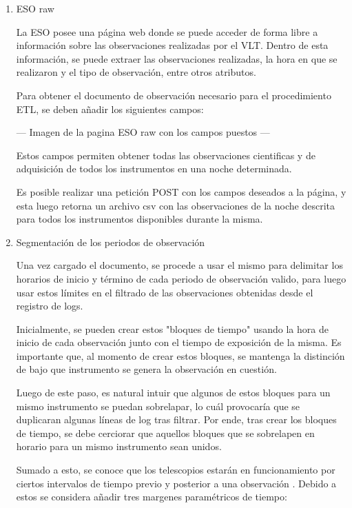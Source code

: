 \begin{enumerate}

    \item{ESO raw}
    
    La ESO posee una página web donde se puede acceder de forma libre a información sobre las observaciones realizadas por el VLT. Dentro de esta información, se puede extraer las observaciones realizadas, la hora en que se realizaron y el tipo de observación, entre otros atributos.
    
    Para obtener el documento de observación necesario para el procedimiento ETL, se deben añadir los siguientes campos:
    
    --- Imagen de la pagina ESO raw con los campos puestos ---
    
    Estos campos permiten obtener todas las observaciones cientificas y de adquisición de todos los instrumentos en una noche determinada.
    
    Es posible realizar una petición POST con los campos deseados a la página, y esta luego retorna un archivo csv con las observaciones de la noche descrita para todos los instrumentos disponibles durante la misma.

    \item{Segmentación de los periodos de observación}

    Una vez cargado el documento, se procede a usar el mismo para delimitar los horarios de inicio y término de cada periodo de observación valido, para luego usar estos límites en el filtrado de las observaciones obtenidas desde el registro de logs.

    Inicialmente, se pueden crear estos "bloques de tiempo" usando la hora de inicio de cada observación junto con el tiempo de exposición de la misma. Es importante que, al momento de crear estos bloques, se mantenga la distinción de bajo que instrumento se genera la observación en cuestión.

    Luego de este paso, es natural intuir que algunos de estos bloques para un mismo instrumento se puedan sobrelapar, lo cuál provocaría que se duplicaran algunas líneas de log tras filtrar. Por ende, tras crear los bloques de tiempo, se debe cerciorar que aquellos bloques que se sobrelapen en horario para un mismo instrumento sean unidos.

    Sumado a esto, se conoce que los telescopios estarán en funcionamiento por ciertos intervalos de tiempo previo y posterior a una observación \cite{eso1998vlt}. Debido a estos se considera añadir tres margenes paramétricos de tiempo:


\end{enumerate}
